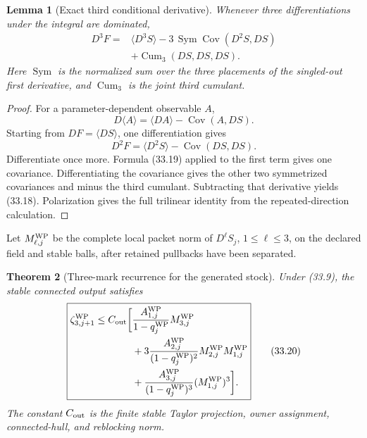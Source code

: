 \documentclass[11pt,oneside]{book}
\newtheorem{theorem}{Theorem}[chapter]
\newtheorem{lemma}[theorem]{Lemma}
\theoremstyle{definition}
\theoremstyle{remark}
\begin{document}
\begin{lemma}[Exact third conditional derivative]
\label{lem:e8v33-third-identity}
Whenever three differentiations under the integral are dominated,
\[
\boxed{
\begin{split}
 D^3F={}&
 \langle D^3S\rangle
 -3\,\operatorname{Sym}\operatorname{Cov}(D^2S,DS)\\
 &+\operatorname{Cum}_3(DS,DS,DS).
\end{split}}                                                     \tag{33.18}
\]
Here \(\operatorname{Sym}\) is the normalized sum over the three
placements of the singled-out first derivative, and
\(\operatorname{Cum}_3\) is the joint third cumulant.
\end{lemma}

\begin{proof}
For a parameter-dependent observable \(A\),
\[
 D\langle A\rangle
 =\langle DA\rangle-\operatorname{Cov}(A,DS).                    \tag{33.19}
\]
Starting from \(DF=\langle DS\rangle\), one differentiation gives
\[
 D^2F=\langle D^2S\rangle-\operatorname{Cov}(DS,DS).
\]
Differentiate once more.  Formula (33.19) applied to the first term
gives one covariance.  Differentiating the covariance gives the
other two symmetrized covariances and minus the third cumulant.
Subtracting that derivative yields (33.18).  Polarization gives the
full trilinear identity from the repeated-direction calculation.
\end{proof}

Let \(M_{\ell,j}^{\rm WP}\) be the complete local packet norm of
\(D^\ell S_j\), \(1\leq\ell\leq3\), on the declared field and stable
balls, after retained pullbacks have been separated.

\begin{theorem}[Three-mark recurrence for the generated stock]
\label{thm:e8v33-third-bound}
Under (33.9), the stable connected output satisfies
\[
\boxed{
\begin{split}
 \zeta^{\rm WP}_{3,j+1}
 \leq C_{\rm out}\bigg[
 &\frac{A_{1,j}^{\rm WP}}{1-q_j^{\rm WP}}M_{3,j}^{\rm WP}\\
 &+3\frac{A_{2,j}^{\rm WP}}{(1-q_j^{\rm WP})^2}
 M_{2,j}^{\rm WP}M_{1,j}^{\rm WP}\\
 &+\frac{A_{3,j}^{\rm WP}}{(1-q_j^{\rm WP})^3}
 (M_{1,j}^{\rm WP})^3
 \bigg].
\end{split}}                                                     \tag{33.20}
\]
The constant \(C_{\rm out}\) is the finite stable Taylor projection,
owner assignment, connected-hull, and reblocking norm.
\end{theorem}
\end{document}
